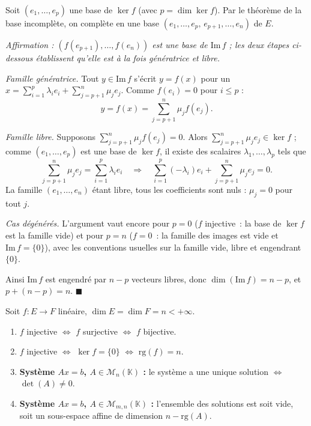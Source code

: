 \begin{mdframed}[style=proofbar]
  Soit $(e_1,\ldots,e_p)$ une base de $\ker f$ (avec $p = \dim\ker f$).
  Par le théorème de la base incomplète,
  on complète en une base $(e_1,\ldots,e_p,\, e_{p+1},\ldots,e_n)$ de $E$.

  \textit{Affirmation : $(f(e_{p+1}),\ldots,f(e_n))$ est une base de $\mathrm{Im}\,f$ ;
  les deux étapes ci-dessous établissent qu'elle est à la fois génératrice et libre.}

  \smallskip
  \textit{Famille génératrice.}
  Tout $y \in \mathrm{Im}\,f$ s'écrit $y = f(x)$ pour un
  $x = \sum_{i=1}^p \lambda_i e_i + \sum_{j=p+1}^n \mu_j e_j$.
  Comme $f(e_i) = 0$ pour $i \leq p$ :
  \[
    y = f(x) = \sum_{j=p+1}^n \mu_j f(e_j).
  \]

  \smallskip
  \textit{Famille libre.}
  Supposons $\sum_{j=p+1}^n \mu_j f(e_j) = 0$.
  Alors $\sum_{j=p+1}^n \mu_j e_j \in \ker f$ ; comme $(e_1,\ldots,e_p)$ est une
  base de $\ker f$, il existe des scalaires $\lambda_1,\ldots,\lambda_p$
  tels que
  \[
    \sum_{j=p+1}^n \mu_j e_j = \sum_{i=1}^p \lambda_i e_i
    \quad\Longrightarrow\quad
    \sum_{i=1}^p (-\lambda_i)e_i + \sum_{j=p+1}^n \mu_j e_j = 0.
  \]
  La famille $(e_1,\ldots,e_n)$ étant libre, tous les coefficients sont nuls :
  $\mu_j = 0$ pour tout $j$.

  \smallskip
  \textit{Cas dégénérés.}
  L'argument vaut encore pour $p = 0$ ($f$ injective~: la base de $\ker f$ est
  la famille vide) et pour $p = n$ ($f = 0$~: la famille des images est vide et
  $\mathrm{Im}\,f = \{0\}$), avec les conventions usuelles sur la famille vide,
  libre et engendrant $\{0\}$.

  \smallskip
  Ainsi $\mathrm{Im}\,f$ est engendré par $n-p$ vecteurs libres, donc
  $\dim(\mathrm{Im}\,f) = n - p$, et $p + (n-p) = n$.
  \hfill$\blacksquare$
\end{mdframed}

\decsep{}


\begin{tcolorbox}[thmbox]
  Soit $f : E \to F$ linéaire, $\dim E = \dim F = n < +\infty$.
  \begin{enumerate}
    \item $f$ injective $\Leftrightarrow$ $f$ surjective $\Leftrightarrow$ $f$ bijective.
    \item $f$ injective $\Leftrightarrow$ $\ker f = \{0\}$ $\Leftrightarrow$ $\mathrm{rg}(f) = n$.
    \item \textbf{Système $Ax = b$, $A \in \mathcal{M}_n(\mathbb{K})$ :}
          le système a une unique solution $\Leftrightarrow$ $\det(A)\neq 0$.
    \item \textbf{Système $Ax = b$, $A \in \mathcal{M}_{m,n}(\mathbb{K})$ :}
          l'ensemble des solutions est soit vide, soit un sous-espace affine
          de dimension $n - \mathrm{rg}(A)$.
  \end{enumerate}
\end{tcolorbox}

